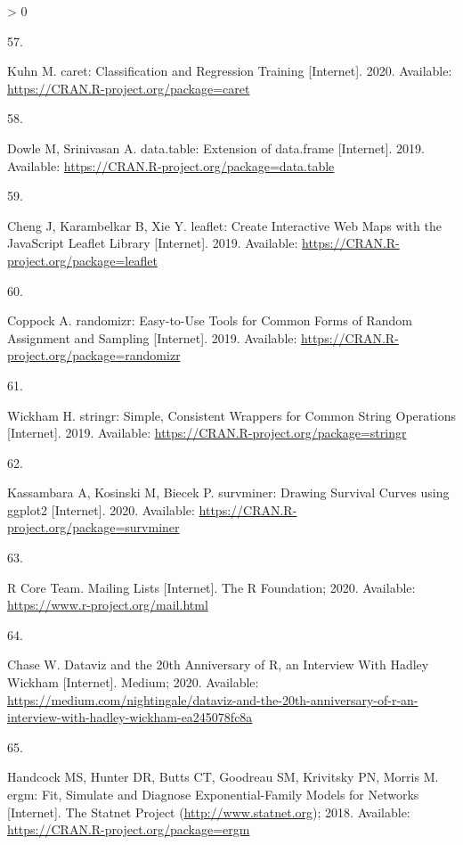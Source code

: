 \documentclass[10pt,letterpaper]{article}
\newlength{\csllabelwidth}
\newlength{\cslhangindent}
\newenvironment{CSLReferences}[3] %
 {%
  \setlength{\parindent}{0pt}
  \ifodd #1 \everypar{\setlength{\hangindent}{\cslhangindent}}\ignorespaces\fi
  \ifnum #2 > 0
  \setlength{\parskip}{#2\baselineskip}
  \fi
 }%
 {}
\newcommand{\CSLLeftMargin}[1]{\parbox[t]{\csllabelwidth}{#1}}
\newcommand{\CSLRightInline}[1]{\parbox[t]{\linewidth - \csllabelwidth}{#1}}
\begin{document}
\begin{CSLReferences}{0}{0}
\leavevmode\hypertarget{ref-caret}{}%
\CSLLeftMargin{57. }
\CSLRightInline{Kuhn M. {caret: Classification and Regression Training}
{[}Internet{]}. 2020. Available:
\url{https://CRAN.R-project.org/package=caret}}

\leavevmode\hypertarget{ref-datatable}{}%
\CSLLeftMargin{58. }
\CSLRightInline{Dowle M, Srinivasan A. {data.table: Extension of
data.frame} {[}Internet{]}. 2019. Available:
\url{https://CRAN.R-project.org/package=data.table}}

\leavevmode\hypertarget{ref-leaflet}{}%
\CSLLeftMargin{59. }
\CSLRightInline{Cheng J, Karambelkar B, Xie Y. {leaflet: Create
Interactive Web Maps with the JavaScript Leaflet Library}
{[}Internet{]}. 2019. Available:
\url{https://CRAN.R-project.org/package=leaflet}}

\leavevmode\hypertarget{ref-randomizr}{}%
\CSLLeftMargin{60. }
\CSLRightInline{Coppock A. {randomizr: Easy-to-Use Tools for Common
Forms of Random Assignment and Sampling} {[}Internet{]}. 2019.
Available: \url{https://CRAN.R-project.org/package=randomizr}}

\leavevmode\hypertarget{ref-stringr}{}%
\CSLLeftMargin{61. }
\CSLRightInline{Wickham H. {stringr: Simple, Consistent Wrappers for
Common String Operations} {[}Internet{]}. 2019. Available:
\url{https://CRAN.R-project.org/package=stringr}}

\leavevmode\hypertarget{ref-survminer}{}%
\CSLLeftMargin{62. }
\CSLRightInline{Kassambara A, Kosinski M, Biecek P. {survminer: Drawing
Survival Curves using ggplot2} {[}Internet{]}. 2020. Available:
\url{https://CRAN.R-project.org/package=survminer}}

\leavevmode\hypertarget{ref-Rmail2020}{}%
\CSLLeftMargin{63. }
\CSLRightInline{R Core Team. {Mailing Lists} {[}Internet{]}. The R
Foundation; 2020. Available: \url{https://www.r-project.org/mail.html}}

\leavevmode\hypertarget{ref-chase2020}{}%
\CSLLeftMargin{64. }
\CSLRightInline{Chase W. {Dataviz and the 20th Anniversary of R, an
Interview With Hadley Wickham} {[}Internet{]}. Medium; 2020. Available:
\url{https://medium.com/nightingale/dataviz-and-the-20th-anniversary-of-r-an-interview-with-hadley-wickham-ea245078fc8a}}

\leavevmode\hypertarget{ref-statnet}{}%
\CSLLeftMargin{65. }
\CSLRightInline{Handcock MS, Hunter DR, Butts CT, Goodreau SM, Krivitsky
PN, Morris M. {ergm: Fit, Simulate and Diagnose Exponential-Family
Models for Networks} {[}Internet{]}. The Statnet Project
(\url{http://www.statnet.org}); 2018. Available:
\url{https://CRAN.R-project.org/package=ergm}}


\end{CSLReferences}
\end{document}
